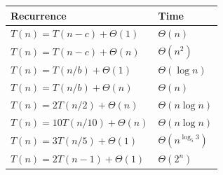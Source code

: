 \documentclass[8pt,a4paper]{extarticle}
\newlength{\tablefixed}
\begin{document}
\par\settowidth{\tablefixed}{$\Theta(n\log n)$}
\begin{tabular}{@{}p{\dimexpr\linewidth-\tablefixed-2\tabcolsep-2pt\relax}l@{}}
\textbf{Recurrence} & \textbf{Time}\\\hline
$T(n)=T(n-c)+\Theta(1)$ & $\Theta(n)$\\
$T(n)=T(n-c)+\Theta(n)$ & $\Theta(n^2)$\\
$T(n)=T(n/b)+\Theta(1)$ & $\Theta(\log n)$\\
$T(n)=T(n/b)+\Theta(n)$ & $\Theta(n)$\\
$T(n)=2T(n/2)+\Theta(n)$ & $\Theta(n\log n)$\\
$T(n)=10T(n/10)+\Theta(n)$ & $\Theta(n\log n)$\\
$T(n)=3T(n/5)+\Theta(1)$ & $\Theta(n^{\log_5 3})$\\
$T(n)=2T(n-1)+\Theta(1)$ & $\Theta(2^n)$\\
\end{tabular}\par
\end{document}
